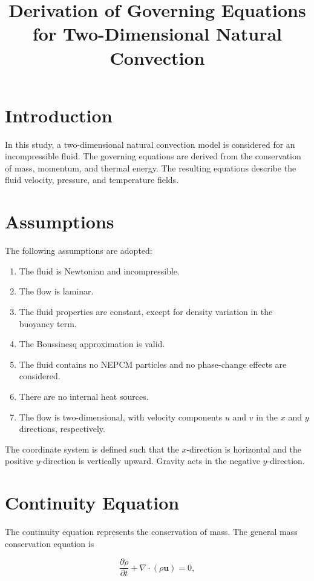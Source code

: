 \documentclass{article}
\title{Derivation of Governing Equations for Two-Dimensional Natural Convection}
\author{}
\date{}
\begin{document}
\maketitle

\section{Introduction}

In this study, a
two-dimensional natural convection model is considered for an
incompressible fluid. The governing equations are derived from the conservation of
mass, momentum, and thermal energy. The resulting equations
describe the fluid velocity, pressure, and temperature fields.

\section{Assumptions}

The following assumptions are adopted:

\begin{enumerate}
    \item The fluid is Newtonian and incompressible.
    \item The flow is laminar.
    \item The fluid properties are constant, except for density
    variation in the buoyancy term.
    \item The Boussinesq approximation is valid.
    \item The fluid contains no NEPCM particles and no phase-change
    effects are considered.
    \item There are no internal heat sources.
    \item The flow is two-dimensional, with velocity components
    $u$ and $v$ in the $x$ and $y$ directions, respectively.
\end{enumerate}

The coordinate system is defined such that the $x$-direction is
horizontal and the positive $y$-direction is vertically upward.
Gravity acts in the negative $y$-direction.

\section{Continuity Equation}

The continuity equation represents the conservation of mass.
The general mass conservation equation is

\begin{equation}
\frac{\partial \rho}{\partial t}
+\nabla\cdot(\rho\mathbf{u})=0,
\label{eq:mass_general}
\end{equation}
\end{document}
